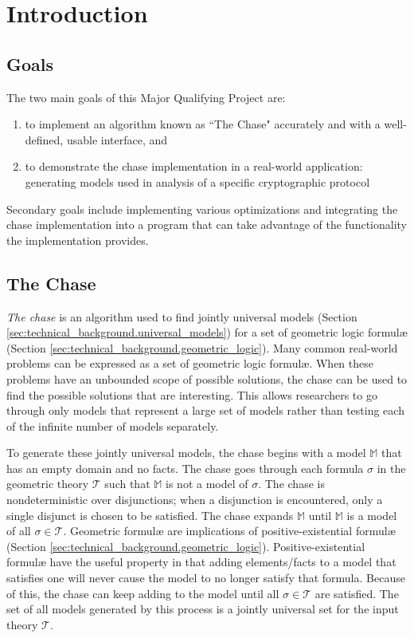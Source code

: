 \section{Introduction}

	\subsection{Goals}

		The two main goals of this Major Qualifying Project are:

		\begin{enumerate}
		\item to implement an algorithm known as ``The Chase" accurately
		and with a well-defined, usable interface, and
		\item to demonstrate the chase implementation in a real-world
		application: generating models used in analysis of a specific
		cryptographic protocol
		\end{enumerate}

		Secondary goals include implementing various optimizations and
		integrating the chase implementation into a program that can take
		advantage of the functionality the implementation provides.

	\subsection{The Chase}

		\emph{The chase} is an algorithm used to find jointly universal models
		(Section \ref{sec:technical_background.universal_models}) for a set of
		geometric logic formul{\ae} (Section
		\ref{sec:technical_background.geometric_logic}). Many common real-world
		problems can be expressed as a set of geometric logic formul{\ae}. When
		these problems have an unbounded scope of possible solutions, the chase
		can be used to find the possible solutions that are interesting. This
		allows researchers to go through only models that represent a large set
		of models rather than testing each of the infinite number of models
		separately.


		To generate these jointly universal models, the chase begins with a
		model $\mathbb{M}$ that has an empty domain and no facts. The chase
		goes through each formula $\sigma$ in the geometric theory
		$\mathcal{T}$ such that $\mathbb{M}$ is not a model of $\sigma$. The
		chase is nondeterministic over disjunctions; when a disjunction is
		encountered, only a single disjunct is chosen to be satisfied. The
		chase expands $\mathbb{M}$ until $\mathbb{M}$ is a model of all $\sigma
		\in \mathcal{T}$. Geometric formul{\ae} are implications of
		positive-existential formul{\ae} (Section
		\ref{sec:technical_background.geometric_logic}). Positive-existential
		formul{\ae} have the useful property in that adding elements/facts to a
		model that satisfies one will never cause the model to no longer
		satisfy that formula. Because of this, the chase can keep adding to the
		model until all $\sigma \in \mathcal{T}$ are satisfied. The set of all
		models generated by this process is a jointly universal set for the
		input theory $\mathcal{T}$.

